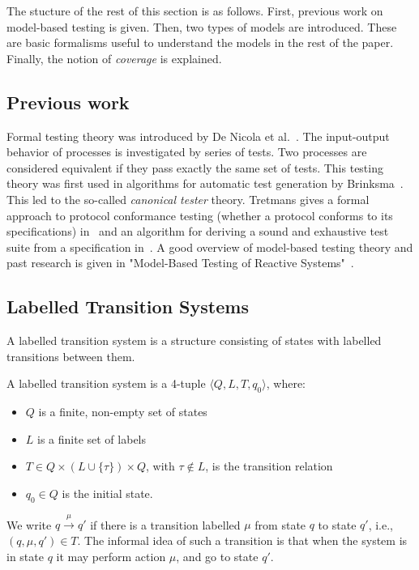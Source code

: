 The stucture of the rest of this section is as follows. First, previous work on model-based testing is given. Then, two types of models are introduced. These are basic formalisms useful to understand the models in the rest of the paper. Finally, the notion of \textit{coverage} is explained.

\subsection{Previous work}
Formal testing theory was introduced by De Nicola et al.~\cite{denicola:testing}. The input-output behavior of processes is investigated by series of tests. Two processes are considered equivalent if they pass exactly the same set of tests. This testing theory was first used in algorithms for automatic test generation by Brinksma~\cite{brinksma:testgeneration}. This led to the so-called \textit{canonical tester} theory. Tretmans gives a formal approach to protocol conformance testing (whether a protocol conforms to its specifications) in~\cite{Tretmans:conformancetesting} and an algorithm for deriving a sound and exhaustive test suite from a specification in~\cite{Tretmans:testgeneration}. A good overview of model-based testing theory and past research is given in "Model-Based Testing of Reactive Systems"~\cite{Broy:ModelBasedTesting}.

\subsection{Labelled Transition Systems}
A labelled transition system is a structure consisting of states with labelled transitions between them.
\vspace{5px}
\begin{definition}
A labelled transition system is a 4-tuple	$\langle Q, L, T, q_0\rangle$, where:
\begin{itemize}
\item $Q$ is a finite, non-empty set of states
\item $L$ is a finite set of labels
\item $T \in Q \times (L \cup \{\tau\}) \times Q$, with $\tau \notin L$, is the transition relation
\item $q_0 \in Q$ is the initial state.
\end{itemize}
We write $q \xrightarrow{\mu}q'$ if there is a transition labelled $\mu$ from state $q$ to state $q'$, i.e., $(q, \mu, q') \in T$. The informal idea of such a transition is that when the system is in state $q$ it may perform action $\mu$, and go to state $q'$. 
\end{definition}

